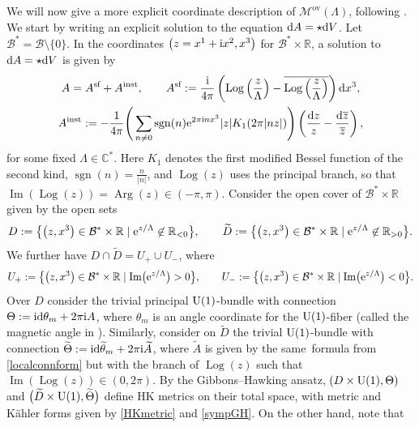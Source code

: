 We will now give a more explicit coordinate description of $\mathcal{M}^{\text{ov}}(\Lambda)$, following \cite[Section~4.1]{GMN1}. We start by writing an explicit solution to the equation ${\rm d}A=\star {\rm d}V$. Let $\mathcal{B}^*=\mathcal{B}\setminus\{0\}$. In the coordinates $\bigl(z=x^1+{\rm i}x^2, x^3\bigr)$ for $\mathcal{B}^*\times \mathbb{R}$, a solution to ${\rm d}A=\star {\rm d}V$ is given by
\begin{gather}
 A=A^{\text{sf}}+A^{\text{inst}},\qquad
 A^{\text{sf}}:=\frac{{\rm i}}{4\pi}\left(\operatorname{Log}\left(\frac{z}{\Lambda}\right)-\overline{\operatorname{Log}\left(\frac{z}{\Lambda}\right)}\right){\rm d}x^3,\nonumber\\
 A^{\text{inst}}:=-\frac{1}{4\pi}\Bigg(\sum_{n\neq 0} \operatorname{sgn}(n){\rm e}^{2\pi {\rm i}nx^3}|z|K_1(2\pi|nz|)\Bigg)\left(\frac{{\rm d}z}{z}-\frac{{\rm d}\overline{z}}{\overline{z}}\right),\label{localconnform}
\end{gather}
for some fixed $\Lambda \in \mathbb{C}^*$. Here $K_1$ denotes the first modified Bessel function of the second kind, $\operatorname{sgn}(n)=\frac{n}{|n|}$, and $\operatorname{Log}(z)$ uses the principal branch, so that $\operatorname{Im}(\operatorname{Log}(z))=\operatorname{Arg}(z)\in(-\pi,\pi)$. Consider the open cover of $\mathcal{B}^*\times \mathbb{R}$ given by the open sets
\begin{equation*}
D:=\bigl\{\bigl(z,x^3\bigr)\in \mathcal{B}^*\times \mathbb{R} \mid {\rm e}^{z/\Lambda}\not\in \mathbb{R}_{<0}\bigr\}, \qquad \widetilde{D}:=\bigl\{\bigl(z,x^3\bigr)\in \mathcal{B}^*\times \mathbb{R} \mid {\rm e}^{z/\Lambda}\not\in \mathbb{R}_{>0}\bigr\}.
\end{equation*}
We further have $D\cap \widetilde{D}=U_{+}\cup U_{-}$, where
\begin{equation*}
 U_{+}:=\bigl\{\bigl(z,x^3\bigr)\in \mathcal{B}^*\times \mathbb{R} \mid \operatorname{Im}\bigl({\rm e}^{z/\Lambda}\bigr)>0\bigr\}, \qquad U_{-}:=\bigl\{\bigl(z,x^3\bigr)\in \mathcal{B}^*\times \mathbb{R} \mid \operatorname{Im}\bigl({\rm e}^{z/\Lambda}\bigr)<0\bigr\}.
\end{equation*}
Over $D$ consider the trivial principal ${\rm U}(1)$-bundle with connection $\Theta:={\rm i}{\rm d}\theta_m +2\pi {\rm i}A$, where $\theta_m$ is an angle coordinate for the ${\rm U}(1)$-fiber (called the magnetic angle in \cite{GMN1}). Similarly, consider on $\widetilde{D}$ the trivial ${\rm U}(1)$-bundle with connection $\widetilde{\Theta}:={\rm i}{\rm d}\widetilde{\theta}_m+ 2\pi {\rm i}\widetilde{A}$, where $\widetilde{A}$ is given by the same~formula from \eqref{localconnform} but with the branch of $\operatorname{Log}(z)$ such that $\operatorname{Im}(\operatorname{Log}(z))\in (0,2\pi)$. By the Gibbons--Hawking ansatz, $(D\times {\rm U}(1),\Theta)$ and $\bigl(\widetilde{D}\times {\rm U}(1), \widetilde{\Theta}\bigr)$ define HK metrics on their total space, with metric and K\"ahler forms given by \eqref{HKmetric} and \eqref{sympGH}. On the other hand, note that
